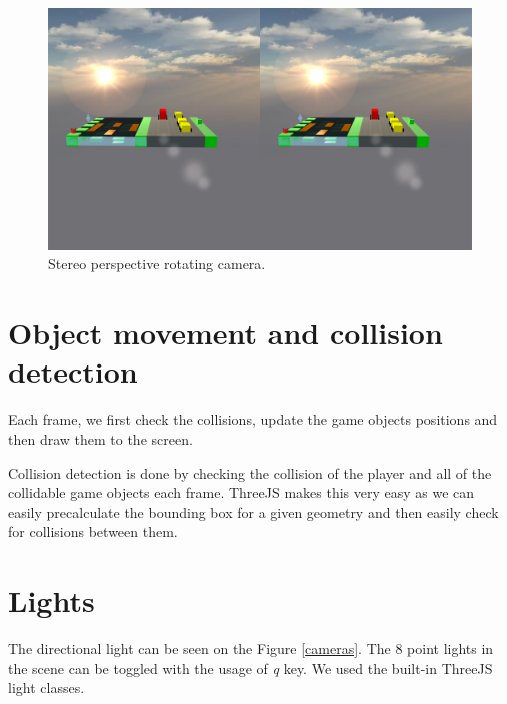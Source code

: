 \documentclass[a4paper,10pt, twocolumn]{article}
\begin{document}
\begin{figure}[!htb]
	\centering
 	\includegraphics[width=\linewidth]{images/cam_stereo.png}
  	\caption{Stereo perspective rotating camera.}
	\label{stereocam}
\end{figure}

\section{Object movement and collision detection}
Each frame, we first check the collisions, update the game objects positions and then draw them to the screen. 

Collision detection is done by checking the collision of the player and all of the collidable game objects each frame. ThreeJS makes this very easy as we can easily precalculate the bounding box for a given geometry and then easily check for collisions between them. 


\section{Lights}
The directional light can be seen on the Figure \ref{cameras}. The 8 point lights in the scene can be toggled with the usage of \emph{q} key. We used the built-in ThreeJS light classes.
\end{document}
